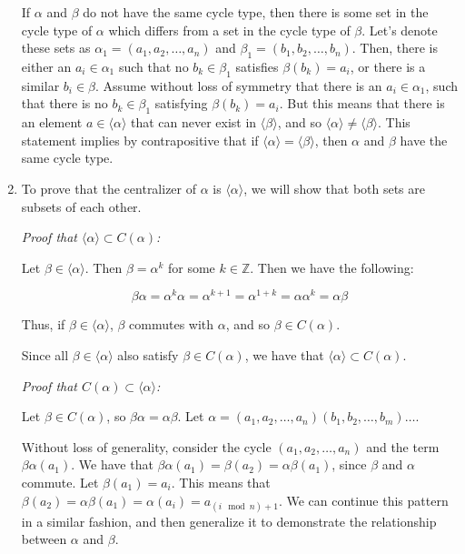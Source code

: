 \documentclass{article}
\begin{document}
\begin{enumerate}
    If $\alpha$ and $\beta$ do not have the same cycle type, then there is some set in the cycle type of $\alpha$ which differs from a set in the cycle type of $\beta$. Let's denote these sets as $\alpha_1 = (a_1, a_2, \dots, a_n)$ and $\beta_1 = (b_1, b_2, \dots, b_n)$. Then, there is either an $a_i \in \alpha_1$ such that no $b_k \in \beta_1$ satisfies $\beta(b_k) = a_i$, or there is a similar $b_i \in \beta.$ Assume without loss of symmetry that there is an $a_i \in \alpha_1$, such that there is no $b_k \in \beta_1$ satisfying $\beta(b_k) = a_i$. But this means that there is an element $a \in \langle \alpha \rangle$ that can never exist in $\langle \beta \rangle$, and so $\langle \alpha \rangle \neq \langle \beta \rangle$. This statement implies by contrapositive that if $\langle \alpha \rangle = \langle \beta \rangle$, then $\alpha$ and $\beta$ have the same cycle type.

    \item To prove that the centralizer of $\alpha$ is $\langle \alpha \rangle$, we will show that both sets are subsets of each other. 

    \textit{Proof that $\langle \alpha \rangle \subset C(\alpha)$:}

    Let $\beta \in \langle \alpha \rangle$. Then $\beta = \alpha^k$ for some $k \in \mathbb{Z}$. Then we have the following:
    
    $$\beta\alpha = \alpha^k\alpha = \alpha^{k+1} = \alpha^{1+k} = \alpha\alpha^k = \alpha\beta$$

    Thus, if $\beta \in \langle \alpha \rangle$, $\beta$ commutes with $\alpha$, and so $\beta \in C(\alpha)$.

    Since all $\beta \in \langle \alpha \rangle$ also satisfy $\beta \in C(\alpha)$, we have that $\langle \alpha \rangle \subset C(\alpha)$.

    \textit{Proof that $C(\alpha) \subset \langle \alpha \rangle$:}

    Let $\beta \in C(\alpha)$, so $\beta\alpha = \alpha\beta$. Let $\alpha = (a_1, a_2, \dots, a_n)(b_1, b_2, \dots, b_m)\dots$.

    Without loss of generality, consider the cycle $(a_1, a_2, \dots, a_n)$ and the term $\beta\alpha(a_1)$. We have that $\beta\alpha(a_1) = \beta(a_2) = \alpha\beta(a_1)$, since $\beta$ and $\alpha$ commute. Let $\beta(a_1) = a_i$. This means that $\beta(a_2) = \alpha\beta(a_1) = \alpha(a_i) = a_{(i \mod n) + 1}$. We can continue this pattern in a similar fashion, and then generalize it to demonstrate the relationship between $\alpha$ and $\beta$.


\end{enumerate}
\end{document}
